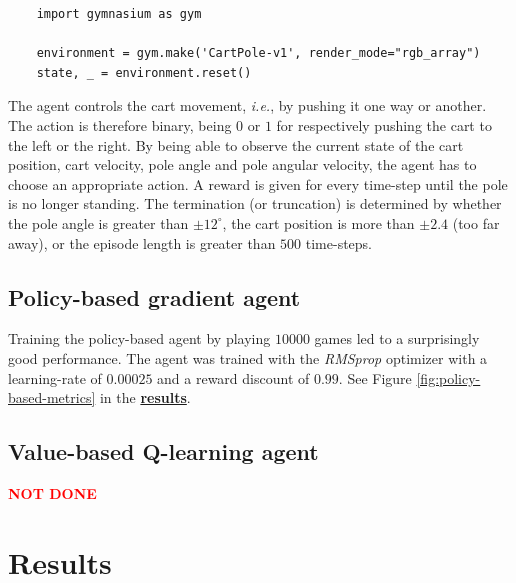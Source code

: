 \documentclass{article}
\let\oldhyperlink\hyperlink
\renewcommand{\hyperlink}[2]{\oldhyperlink{#1}{\textbf{#2}}}
\renewenvironment{leftbar}[1][\hsize]{
    \def\FrameCommand{{\color{barcolor}\vrule width 0.5pt \hspace{10pt}}}
    \MakeFramed{\hsize#1 \advance\hsize-\width \FrameRestore}
}{\endMakeFramed}
\begin{document}
\vspace{0.2cm}

\begin{lstlisting}
    import gymnasium as gym

    environment = gym.make('CartPole-v1', render_mode="rgb_array")
    state, _ = environment.reset()
\end{lstlisting}

The agent controls the cart movement, \textit{i.e.}, by pushing it one way or another. The action is therefore binary, being $0$ or $1$ for respectively pushing the cart to the left or the right. By being able to observe the current state of the cart position, cart velocity, pole angle and pole angular velocity, the agent has to choose an appropriate action. A reward is given for every time-step until the pole is no longer standing. The termination (or truncation) is determined by whether the pole angle is greater than $\pm 12 ^\circ$, the cart position is more than $\pm 2.4$ (too far away), or the episode length is greater than $500$ time-steps.

\subsection*{Policy-based gradient agent}
\begin{leftbar}
    Training the policy-based agent by playing $10 000$ games led to a surprisingly good performance. The agent was trained with the \textit{RMSprop} optimizer with a learning-rate of $0.00025$ and a reward discount of $0.99$. See Figure \ref{fig:policy-based-metrics} in the \hyperlink{sec:results}{results}.
\end{leftbar}
\subsection*{Value-based Q-learning agent}
\begin{leftbar}
    \textbf{\textcolor{red}{NOT DONE}}
\end{leftbar}

\newpage
\printbibliography

\newpage
\hypertarget{sec:results}{}
\section*{Results}
\end{document}
